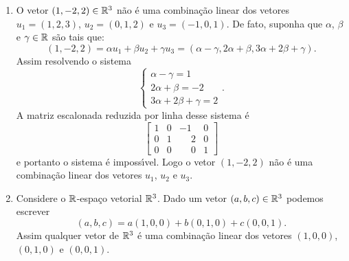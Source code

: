 \begin{exemplo}
\begin{enumerate}[label={\arabic*})]
		\item O vetor $(1, -2, 2) \in \mathbb{R}^3$ n\~ao \'e uma combina\c{c}\~ao linear dos vetores $u_1 = (1, 2, 3)$, $u_2 = (0, 1, 2)$ e $u_3 = (-1, 0, 1)$. De fato, suponha que $\alpha$, $\beta$ e $\gamma \in \mathbb{R}$ s\~ao tais que:
		      \[
			      (1, -2, 2) = \alpha u_1 + \beta u_2 + \gamma u_3 = (\alpha - \gamma, 2\alpha + \beta, 3\alpha + 2\beta + \gamma).
		      \]
		      Assim resolvendo o sistema
		      \[
			      \begin{cases}
				      \alpha - \gamma = 1  \\
				      2\alpha + \beta = -2 \\
				      3\alpha + 2\beta + \gamma = 2
			      \end{cases}.
		      \]
		      A matriz escalonada reduzida por linha desse sistema \'e
		      \[
			      \begin{bmatrix}
				      1 & 0 & -1           & 0 \\
				      0 & 1 & \phantom{-}2 & 0 \\
				      0 & 0 & \phantom{-}0 & 1
			      \end{bmatrix}
		      \]
		      e portanto o sistema \'e imposs{\'\i}vel. Logo o vetor $(1, -2, 2)$ n\~ao \'e uma combina\c{c}\~ao linear dos vetores $u_1$, $u_2$ e $u_3$.

		\item Considere o $\mathbb{R}$-espa\c{c}o vetorial $\mathbb{R}^3$. Dado um vetor $(a, b, c) \in \mathbb{R}^3$ podemos escrever
		      \[
			      (a, b, c) = a(1, 0, 0) + b(0, 1, 0) + c(0, 0, 1).
		      \]
		      Assim qualquer vetor de $\mathbb{R}^3$ \'e uma combina\c{c}\~ao linear dos vetores $(1, 0 , 0)$, $(0, 1 , 0)$ e $(0, 0 , 1)$.


\end{enumerate}
\end{exemplo}
